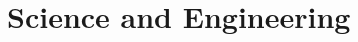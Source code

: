 \section{Science and Engineering}







\begin{comment}
List branches of science and which areas of math are especially important in those:
-Chemistry:
 -Group Theory
 -Quantum Mechanics
-Biology:
 -Differential equations
 -Cellular Automata
 -String replacement systems (Lindenmayer systems)
 -String matching (DNA comparison)
 -Knot Theory (protein strutures)
-Social Sciences:
 -Statistics
-Mechanical Engineering:
 -Linear Algebra (matrices for trusses, etc) 
 -Tensor calculus (due to continuum mechanics)
 -Fourier Theory (vibrations, etc.)
-Electrical Engineering:
 -Complex numbers
 -Fourier- and Laplace Transforms 
-Machine Learning:
 -Multivariate Optimization, Approximation, Fitting, Manifolds
-Computer graphics:
 -Linear algebra
 -Quaternions
 -Projective geometry
 -Geometric Algebra
 -Analytic Geometry



Traffic modeling (with systems of ODEs):

Calm Traffic Needs More Than Calm Driving
https://www.youtube.com/watch?v=m74zazYPwkY

The Problem of Traffic: A Mathematical Modeling Journey
https://www.youtube.com/watch?v=4DRGo3NUM_k

The Simple Solution to Traffic
https://www.youtube.com/watch?v=iHzzSao6ypE


\end{comment}